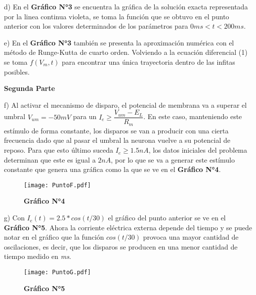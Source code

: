 \documentclass[12pt,a4paper]{article}
\begin{document}
d) En el \textbf{Gráfico N°3} se encuentra la gráfica de la solución exacta representada por la linea continua violeta, se toma la función que se obtuvo en el punto anterior con los valores determinados de los parámetros para $0 ms <t<200ms$.
\bigskip

e) En el \textbf{Gráfico N°3} también se presenta  la aproximación numérica con el método de Runge-Kutta de cuarto orden. Volviendo a la ecuación diferencial (1) se toma $f(V_m,t)$ para encontrar una única trayectoria dentro de las infitas posibles.
\bigskip

\begin{center}
\textbf{Segunda Parte}
\end{center}

f) Al activar el mecanismo de disparo, el potencial de membrana va a superar el umbral $V_{um}=-50 mV$ para un $I_e \geq \dfrac{V_{um}-E_L}{R_m}$. En este caso, manteniendo este estímulo de forma constante, los disparos se van a producir con una cierta frecuencia dado que al pasar el umbral la neurona vuelve a su potencial de reposo. Para que esto último suceda $I_e \geq 1.5nA$, los datos iniciales del problema determinan que este es igual a $2nA$, por lo que se va a generar este estímulo constante que genera una gráfica como la que se ve en el \textbf{Gráfico N°4}. 
\newpage

\begin{figure}[h]
\centering
\caption*{\textbf{Gráfico N°4}}
\texttt{[image: PuntoF.pdf]}
\label{PuntoF}
\end{figure}

g) Con $I_e(t)=2.5*cos(t/30)$ el gráfico del punto anterior se ve en el \textbf{Gráfico N°5}. Ahora la corriente eléctrica externa depende del tiempo y se puede notar en el gráfico que la función $cos(t/30)$ provoca una mayor cantidad de oscilaciones, es decir, que los disparos se producen en una menor cantidad de tiempo medido en \textit{ms}.

\begin{figure}[h]
\centering
\caption*{\textbf{Gráfico N°5}}
\texttt{[image: PuntoG.pdf]}
\label{PuntoG}
\end{figure}
\end{document}
